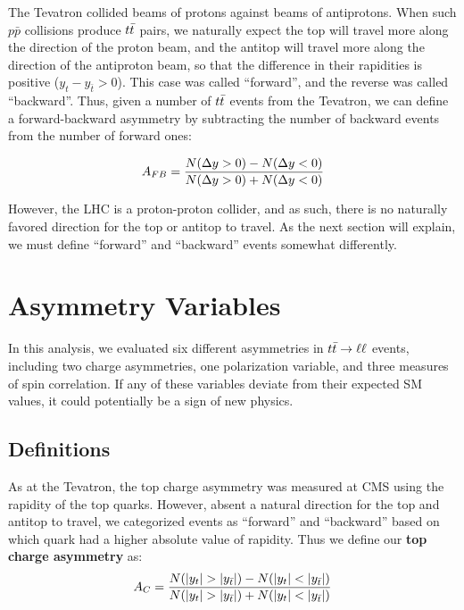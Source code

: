 The Tevatron collided beams of protons against beams of
antiprotons. When such $p\bar{p}$ collisions produce
$t\bar{t}$ pairs, we naturally expect the top will travel more along the direction
of the proton beam, and the antitop will travel
more along the direction of the antiproton beam, so that the
difference in their rapidities is positive ($y_t - y_{\bar{t}} > 0$).
This case was called ``forward'', and the reverse was called
``backward''. Thus, given a number of $t\bar{t}$
events from the Tevatron, we can define a forward-backward
asymmetry by subtracting the number of backward events from the number
of forward ones:

\begin{equation}
A_{FB} = \frac{N(\Delta y>0) - N(\Delta y<0)}{N(\Delta y>0) + N(\Delta y<0)}
\end{equation}

However, the LHC is a proton-proton collider, and as such, there is no
naturally favored direction for the top or antitop to travel. As the
next section will explain, we must define ``forward'' and ``backward''
events somewhat differently.

\section{Asymmetry Variables}
\label{sec:afb:variables}

In this analysis, we evaluated six different asymmetries in $t\bar{t} \rightarrow \ell\ell$
events, including two charge asymmetries, one polarization variable,
and three measures of spin correlation. If any of these
variables deviate from their expected SM values, it could potentially
be a sign of new physics.

\subsection{Definitions}
\label{ssec:afb:variables}

As at the Tevatron, the top charge asymmetry was measured at CMS using
the rapidity of the top quarks. However, absent a natural direction
for the top and antitop to travel, we categorized events as
``forward'' and ``backward'' based on which quark had a higher
absolute value of rapidity. Thus we define our \textbf{top charge
asymmetry} as:
\begin{equation}
A_C = \asymmetry{|y_t|}{|y_{\bar{t}}|}
\label{eq:afb:topchargeasym}
\end{equation}

